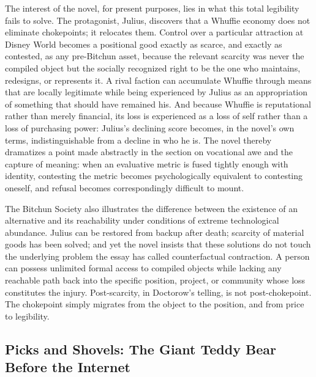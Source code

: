 \documentclass[11pt]{article}
\begin{document}
The interest of the novel, for present purposes, lies in what this total legibility fails to solve. The protagonist, Julius, discovers that a Whuffie economy does not eliminate chokepoints; it relocates them. Control over a particular attraction at Disney World becomes a positional good exactly as scarce, and exactly as contested, as any pre-Bitchun asset, because the relevant scarcity was never the compiled object but the socially recognized right to be the one who maintains, redesigns, or represents it. A rival faction can accumulate Whuffie through means that are locally legitimate while being experienced by Julius as an appropriation of something that should have remained his. And because Whuffie is reputational rather than merely financial, its loss is experienced as a loss of self rather than a loss of purchasing power: Julius's declining score becomes, in the novel's own terms, indistinguishable from a decline in who he is. The novel thereby dramatizes a point made abstractly in the section on vocational awe and the capture of meaning: when an evaluative metric is fused tightly enough with identity, contesting the metric becomes psychologically equivalent to contesting oneself, and refusal becomes correspondingly difficult to mount.

The Bitchun Society also illustrates the difference between the existence of an alternative and its reachability under conditions of extreme technological abundance. Julius can be restored from backup after death; scarcity of material goods has been solved; and yet the novel insists that these solutions do not touch the underlying problem the essay has called counterfactual contraction. A person can possess unlimited formal access to compiled objects while lacking any reachable path back into the specific position, project, or community whose loss constitutes the injury. Post-scarcity, in Doctorow's telling, is not post-chokepoint. The chokepoint simply migrates from the object to the position, and from price to legibility.

\subsection{Picks and Shovels: The Giant Teddy Bear Before the Internet}
\end{document}
